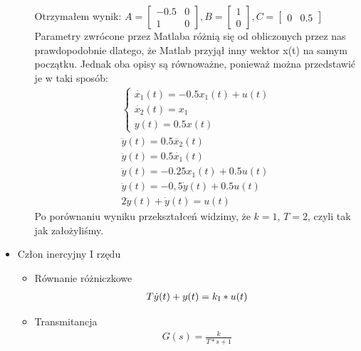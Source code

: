 \documentclass[a4paper,10pt]{article}
\begin{document}
\begin{itemize}
\begin{itemize}
Otrzymałem wynik:
$A = \left[ \begin{array}{ll} -0.5 & 0\\ 1 & 0 \end{array} \right], B = \left[ \begin{array}{l} 1\\ 0 \end{array} \right], C = \left[ \begin{array}{ll} 0 & 0.5 \end{array} \right]$
\newline \newline Parametry zwrócone przez Matlaba różnią się od obliczonych przez nas prawdopodobnie dlatego, że Matlab przyjął inny wektor x(t) na samym początku. Jednak oba opisy są równoważne, ponieważ można przedstawić je w taki sposób:
\begin{eqnarray}
\nonumber \left\{ \begin{array}{l}
\dot{x_{1}}(t) = -0.5x_{1}(t) + u(t)\\
\dot{x_{2}}(t) = x_{1}\\
y(t) = 0.5x(t)
\end{array} \right. \\
\nonumber \ddot{y}(t) = 0.5\ddot{x_{2}}(t)\\
\nonumber \ddot{y}(t) = 0.5\dot{x_{1}}(t)\\
\nonumber \ddot{y}(t) = -0.25x_{1}(t) + 0.5u(t)\\
\nonumber \ddot{y}(t) = -0,5\dot{y}(t) + 0.5u(t)\\
2\ddot{y}(t) + \dot{y}(t) = u(t)
\end{eqnarray}
Po porównaniu wyniku przekształceń widzimy, że $k=1$, $T=2$, czyli tak jak założyliśmy.	
\end{itemize}
	
\item Człon inercyjny I rzędu

\begin{itemize}
	\item Równanie różniczkowe
	\begin{eqnarray}
	T\dot{y}(t)+y(t) = k\textsubscript I *u(t)
	\end{eqnarray}
	
\item Transmitancja	
	\begin{eqnarray}
		G(s) = \frac{k}{T*s+1}
	\end{eqnarray}


\end{itemize}
\end{itemize}
\end{document}
